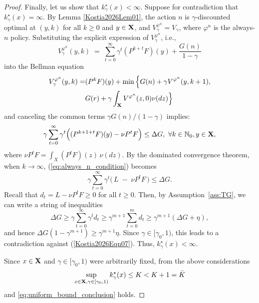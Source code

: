 \documentclass[10pt,a4paper]{amsart}
\begin{document}
\begin{proof}
{Finally,} let us show that $k^\star_\gamma(x) < \infty$.   
Suppose {for contradiction that}  $k^\star_\gamma(x) = \infty$. {By Lemma \ref{Kostia2026Lem01},} 
the action $n$ is {$\gamma$-discounted} optimal at $({y},k)$ for all {$k\ge 0$ and $y\in{\bf X}$, and $V_\gamma^{\varphi^n}=V_\gamma$, where $\varphi^n$ is the always-$n$ policy.}
Substituting the explicit expression of {$V^{\varphi^n}_\gamma$}, i.e.,
\[
V_\gamma^{{\varphi^n}}({y},k) \; = \; \sum_{t=0}^{\infty}\gamma^{t} (P^{k+t}F)({y}) + \frac{G(n)}{1-\gamma}
\]
into the Bellman equation
{\begin{align*}
V_\gamma^{\varphi^n}(y,k)=&(P^kF)(y)+\min\Big\{G(n)+\gamma V^{\varphi^n}(y,k+1), \\
&G(r)+\gamma \int_{{\bf X}} V^{\varphi^n}(z,0)\nu(dz)  \Big\}
\end{align*}}
and canceling the common terms 
$\gamma G(n)/(1-\gamma)$ implies:
\begin{equation}\label{eq:always_n_condition}
\gamma \sum_{t=0}^{\infty}\gamma^{t}\Big((P^{k+1+t}F)({y})-\nu P^{t}F\Big) \le \Delta G, \
\forall k \in {\mathbb N}_0, y\in {\bf X},
\end{equation}
where $\nu P^{t}F = \int_X (P^{t}F)(z)\,\nu(dz)$. By the dominated convergence theorem,
when $k \to \infty$, (\ref{eq:always_n_condition}) becomes
$$
\gamma \sum_{t=0}^{\infty}\gamma^{t}\Big(\,L\;-\;\nu P^t F\,\Big) \le \Delta G.
$$
{Recall that $d_t = L - \nu P^t F\ge 0$ for all $t\ge 0$}. Then, by  Assumption~\ref{ass:TG},
we can write a string of inequalities
$$
\Delta G \ge \gamma \sum_{t=0}^{\infty}\gamma^{t} d_t 
\ge \gamma^{m+1} \sum_{t=0}^{m} d_t \ge \gamma^{m+1} (\Delta G + \eta),
$$ 
{and hence  $\Delta G (1-\gamma^{m+1})\ge \gamma^{m+1}\eta.$  
Since $\gamma\in [\gamma_0,1)$, this leads to a contradiction  against (\ref{Kostia2026Eqn07}).}
Thus, 
$k^\star_\gamma(x) < \infty$. 

{Since $x\in {\bf X}$ and $\gamma\in[\gamma_0,1)$ were arbitrarily fixed,} from the above considerations 
$$
\sup_{x\in {\bf X},\gamma\in[\gamma_0,1)} k^\star_\gamma(x) \le K < {K+1=\bar{K}}
$$ 
and \eqref{eq:uniform_bound_conclusion} holds.
\end{proof}
\end{document}

